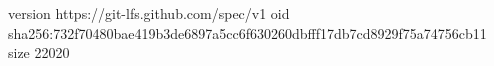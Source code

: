 version https://git-lfs.github.com/spec/v1
oid sha256:732f70480bae419b3de6897a5cc6f630260dbfff17db7cd8929f75a74756cb11
size 22020
